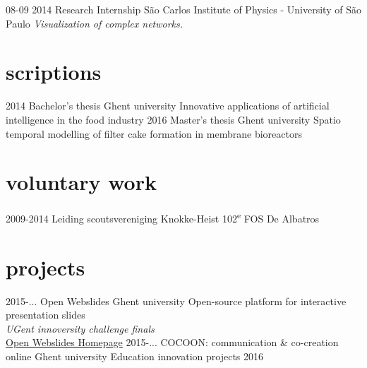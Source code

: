 \documentclass[]{friggeri-cv}
\begin{document}
\begin{entrylist}
  \entry
    {08-09 2014}
    {Research Internship}
    {S\~{a}o Carlos Institute of Physics - University of S\~{a}o Paulo}
    {\emph{Visualization of complex networks.}}
\end{entrylist}

\section{scriptions}

\begin{entrylist}
  \entry
    {2014}
    {Bachelor's thesis}
    {Ghent university}
    {Innovative applications of artificial intelligence in the food industry}
  \entry
    {2016}
    {Master's thesis}
    {Ghent university}
    {Spatio temporal modelling of filter cake formation in membrane bioreactors}
\end{entrylist}

\section{voluntary work}
\begin{entrylist}
 \entry
    {2009-2014}
    {Leiding scoutsvereniging}
    {Knokke-Heist}
    {102\textsuperscript{e} FOS De Albatros}
\end{entrylist} 
\section{projects}
\begin{entrylist}
 \entry
    {2015-...}
    {Open Webslides}
    {Ghent university}
    {Open-source platform for interactive presentation slides \\ \emph{UGent innoversity challenge finals} \\ \href{http://openwebslides.github.io/}{Open Webslides Homepage}}
 \entry
    {2015-...}
    {COCOON: communication \& co-creation online}
    {Ghent university}
    {Education innovation projects 2016}
    
\end{entrylist} 

% 
\end{document}
